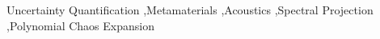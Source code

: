 \documentclass[preprint,review,12pt]{elsarticle}
\begin{document}
\begin{frontmatter}


\begin{keyword}
Uncertainty Quantification \sep Metamaterials \sep Acoustics \sep Spectral Projection \sep Polynomial Chaos Expansion


\end{keyword}

\end{frontmatter}



\end{document}
